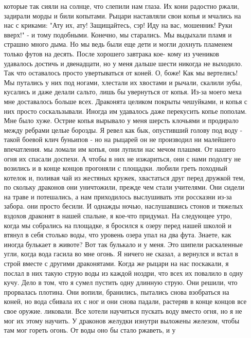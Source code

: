 которые так сияли на солнце, что слепили нам глаза. Их кони радостно 
ржали, задирали морды и били копытами. Рыцари наставляли свои копья и 
мчались на нас с криками: "Ату их, ату! Защищайтесь, сэр! Иду на вас, 
мошенник! Руки вверх!" - и тому подобными. Конечно, мы старались. Мы 
выдыхали пламя и страшно много дыма. Но мы ведь были еще дети и могли 
дохнуть пламенем только футов на десять. После хорошего завтрака кое-
кому из учеников удавалось достичь и двенадцати, но у меня дальше 
шести никогда не выходило. Так что оставалось просто увертываться от 
коней. О, боже! Как мы вертелись! Мы путались у них под ногами, 
хлестали их хвостами и рычали, скалили зубы, кусались и даже делали 
сальто, лишь бы увернуться от копья. Из-за моего меха мне доставалось 
больше всех. Драконята целиком покрыты чешуйками, и копья с них просто 
соскальзывали. Иногда им удавалось даже перекусить копье пополам. Мне 
было хуже. Острие копья вырывало у меня шерсть клочьями и продирало 
между ребрами целые борозды. Я ревел как бык, опустивший голову под 
воду - такой боевой клич буньипов - но на рыцарей он не производил ни 
малейшего впечатления.
 мы ломали им копья, они лупили нас мечом плашмя. От нашего 
огня их спасали доспехи. А чтобы в них не изжариться, они с нами 
подолгу не возились и в конце концов прогоняли с площадки.
 любили греть походный котелок и, поливая чай из жестяных 
кружек, хвастаться друг перед дружкой тем, по скольку драконов они 
уничтожили, прежде чем стали учителями. Они сидели на траве и 
потешались, а нам приходилось выслушивать эти россказни из-за забора.
 они просто бесили. И однажды ночью, наслушавшись стонов и 
тяжелых вздохов драконят в нашей спальне, я кое-что придумал. На 
следующее утро, когда мы собрались на площадке, я бросился к озеру 
перед нашей школой и втянул в себя столько воды, что уровень озера 
упал на два фута. Знаете, как иногда булькает в животе? Вот так 
булькало и у меня. Это шипели раскаленные угли, когда вода гасила во 
мне огонь. Я ничего не сказал, а вернулся и встал в строй вместе с 
другими драконятами. Когда же рыцари на нас поскакали, я послал в них 
такую струю воды из каждой ноздри, что всех их повалило в одну кучу. 
Дело в том, что я сумел пустить одну длинную струю. Они решили, что 
прорвалась плотина. Они вопили, бранились, пытались снова взобраться 
на коней, но вода сбивала их с ног и они снова падали, растеряв в 
конце концов все свое оружие.
 ликовали. Все хотели научиться пускать воду вместо огня, 
но я не мог их этому научить. У драконов желудки изнутри выложены 
железом, чтобы там мог гореть огонь. От воды оно бы стало ржаветь, и у 
